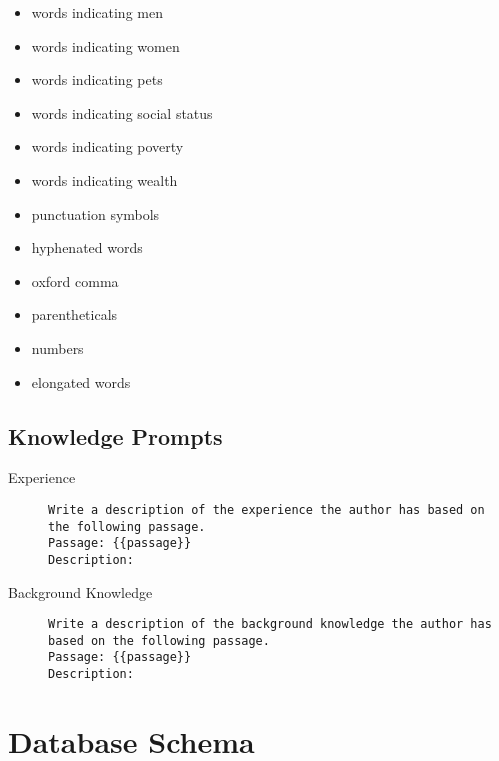 \begin{multicols}{2}
\begin{itemize}[nolistsep]
    \item words indicating men
    \item words indicating women
    \item words indicating pets
    \item words indicating social status
    \item words indicating poverty
    \item words indicating wealth
    \item punctuation symbols
    \item hyphenated words
    \item oxford comma
    \item parentheticals
    \item numbers
    \item elongated words
  \end{itemize}
\end{multicols}

\subsection{Knowledge Prompts}
\label{sec:appendix:knowledgePrompts}
\begin{description}
  \item[Experience]\leavevmode \newline
        \begin{minipage}{\linewidth}
          \begin{lstlisting}
Write a description of the experience the author has based on the following passage.
Passage: {{passage}}
Description:
\end{lstlisting}
        \end{minipage}
  \item[Background Knowledge]\leavevmode \newline
        \begin{minipage}{\linewidth}
          \begin{lstlisting}
Write a description of the background knowledge the author has based on the following passage.
Passage: {{passage}}
Description:
\end{lstlisting}
        \end{minipage}
\end{description}

\section{Database Schema}
\label{sec:appendix:databaseSchema}
